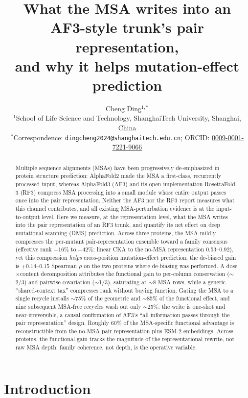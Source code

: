 \documentclass[11pt]{article}
\title{What the MSA writes into an AF3-style trunk's pair representation,\\and why it helps mutation-effect prediction}
\author{Cheng Ding$^{1,\ast}$\\
\small $^{1}$School of Life Science and Technology, ShanghaiTech University, Shanghai, China\\
\small $^{\ast}$Correspondence: \texttt{dingcheng2024@shanghaitech.edu.cn}; ORCID: \href{https://orcid.org/0009-0001-7221-9066}{0009-0001-7221-9066}}
\date{}
\begin{document}
\maketitle

\begin{abstract}
Multiple sequence alignments (MSAs) have been progressively de-emphasized in
protein structure prediction: AlphaFold2 made the MSA a first-class,
recurrently processed input, whereas AlphaFold3 (AF3) and its open
implementation RosettaFold-3 (RF3) compress MSA processing into a small module
whose entire output passes once into the pair representation. Neither the AF3
nor the RF3 report measures what this channel contributes, and all existing
MSA-perturbation evidence is at the input-to-output level. Here we measure, at
the representation level, what the MSA writes into the pair representation of
an RF3 trunk, and quantify its net effect on deep mutational scanning (DMS)
prediction. Across three proteins, the MSA mildly compresses the per-mutant
pair-representation ensemble toward a family consensus (effective rank
$-16\%$ to $-42\%$; linear CKA to the no-MSA representation 0.53--0.92), yet
this compression \emph{helps} cross-position mutation-effect prediction: the
de-biased gain is $+0.14$--$0.15$ Spearman $\rho$ on the two proteins where
de-biasing was performed. A dose$\times$content decomposition attributes the
functional gain to per-column conservation ($\sim$2/3) and pairwise
covariation ($\sim$1/3), saturating at $\sim$8 MSA rows, while a generic
``shared-context tax'' compresses rank without buying function. Gating the MSA
to a single recycle installs $\sim$75\% of the geometric and $\sim$85\% of the
functional effect, and nine subsequent MSA-free recycles wash out only
$\sim$25\%: the write is one-shot and near-irreversible, a causal confirmation
of AF3's ``all information passes through the pair representation'' design.
Roughly 60\% of the MSA-specific functional advantage is reconstructible from
the no-MSA pair representation plus ESM-2 embeddings. Across proteins, the
functional gain tracks the magnitude of the representational rewrite, not raw
MSA depth: family coherence, not depth, is the operative variable.
\end{abstract}

\section{Introduction}
\end{document}
